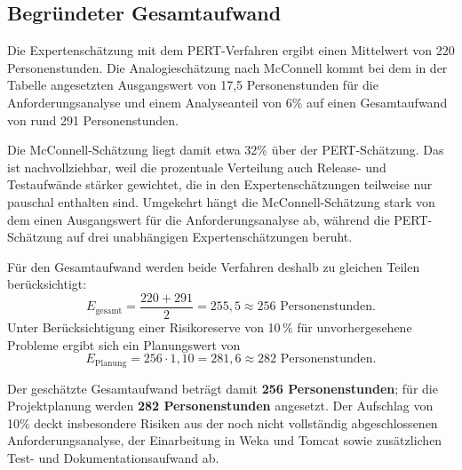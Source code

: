 \documentclass[a4paper,10pt]{article}
\begin{document}
\newpage
\subsection*{Begründeter Gesamtaufwand}
Die Expertenschätzung mit dem PERT-Verfahren ergibt einen Mittelwert von
220 Personenstunden. Die Analogieschätzung nach McConnell kommt bei dem in der
Tabelle angesetzten Ausgangswert von 17,5 Personenstunden für die
Anforderungsanalyse und einem Analyseanteil von 6\% auf einen Gesamtaufwand
von rund 291 Personenstunden.

Die McConnell-Schätzung liegt damit etwa 32\% über der PERT-Schätzung. Das ist
nachvollziehbar, weil die prozentuale Verteilung auch Release- und Testaufwände
stärker gewichtet, die in den Expertenschätzungen teilweise nur pauschal
enthalten sind. Umgekehrt hängt die McConnell-Schätzung stark von dem einen
Ausgangswert für die Anforderungsanalyse ab, während die PERT-Schätzung auf drei
unabhängigen Expertenschätzungen beruht.

Für den Gesamtaufwand werden beide Verfahren deshalb zu gleichen Teilen
berücksichtigt:
\[
E_{\text{gesamt}} = \frac{220 + 291}{2} = 255{,}5 \approx 256
\text{ Personenstunden}.
\]
Unter Berücksichtigung einer Risikoreserve von 10\,\% für unvorhergesehene
Probleme ergibt sich ein Planungswert von
\[
E_{\text{Planung}} = 256 \cdot 1{,}10 = 281{,}6 \approx 282
\text{ Personenstunden}.
\]

Der geschätzte Gesamtaufwand beträgt damit \textbf{256 Personenstunden}; für die
Projektplanung werden \textbf{282 Personenstunden} angesetzt. Der Aufschlag von
10\% deckt insbesondere Risiken aus der noch nicht vollständig abgeschlossenen
Anforderungsanalyse, der Einarbeitung in Weka und Tomcat sowie zusätzlichen
Test- und Dokumentationsaufwand ab.
\end{document}
